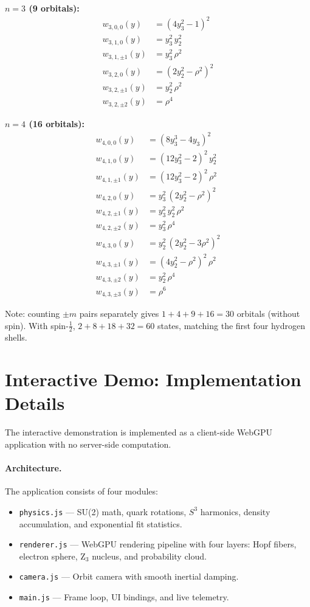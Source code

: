 \documentclass[12pt, a4paper]{article}
\theoremstyle{definition}
\theoremstyle{remark}
\newcommand{\Sthree}{S^3}
\begin{document}
\noindent\textbf{$n = 3$ (9 orbitals):}
\begin{align*}
  w_{3,0,0}(y) &= (4y_3^2 - 1)^2 \\
  w_{3,1,0}(y) &= y_3^2\, y_2^2 \\
  w_{3,1,\pm1}(y) &= y_3^2\, \rho^2 \\
  w_{3,2,0}(y) &= (2y_2^2 - \rho^2)^2 \\
  w_{3,2,\pm1}(y) &= y_2^2\, \rho^2 \\
  w_{3,2,\pm2}(y) &= \rho^4
\end{align*}

\noindent\textbf{$n = 4$ (16 orbitals):}
\begin{align*}
  w_{4,0,0}(y) &= (8y_3^3 - 4y_3)^2 \\
  w_{4,1,0}(y) &= (12y_3^2 - 2)^2\, y_2^2 \\
  w_{4,1,\pm1}(y) &= (12y_3^2 - 2)^2\, \rho^2 \\
  w_{4,2,0}(y) &= y_3^2\,(2y_2^2 - \rho^2)^2 \\
  w_{4,2,\pm1}(y) &= y_3^2\, y_2^2\, \rho^2 \\
  w_{4,2,\pm2}(y) &= y_3^2\, \rho^4 \\
  w_{4,3,0}(y) &= y_2^2\,(2y_2^2 - 3\rho^2)^2 \\
  w_{4,3,\pm1}(y) &= (4y_2^2 - \rho^2)^2\, \rho^2 \\
  w_{4,3,\pm2}(y) &= y_2^2\, \rho^4 \\
  w_{4,3,\pm3}(y) &= \rho^6
\end{align*}

Note: counting $\pm m$ pairs separately gives
$1 + 4 + 9 + 16 = 30$ orbitals (without spin). With spin-$\frac{1}{2}$,
$2 + 8 + 18 + 32 = 60$ states, matching the first four hydrogen shells.


\section{Interactive Demo: Implementation Details}
\label{app:demo}

The interactive demonstration is implemented as a client-side WebGPU
application with no server-side computation.

\paragraph{Architecture.}
The application consists of four modules:
\begin{itemize}[nosep]
  \item \texttt{physics.js} --- SU(2) math, quark rotations, $\Sthree$
    harmonics, density accumulation, and exponential fit statistics.
  \item \texttt{renderer.js} --- WebGPU rendering pipeline with four layers:
    Hopf fibers, electron sphere, Z$_3$ nucleus, and probability cloud.
  \item \texttt{camera.js} --- Orbit camera with smooth inertial damping.
  \item \texttt{main.js} --- Frame loop, UI bindings, and live telemetry.
\end{itemize}
\end{document}
